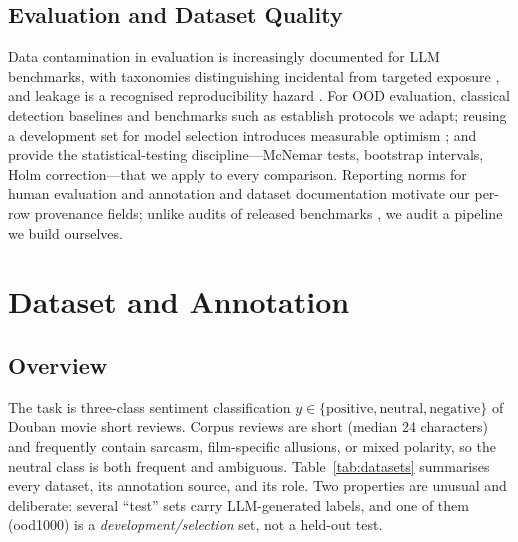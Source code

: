 \subsection{Evaluation and Dataset Quality}

Data contamination in evaluation is increasingly documented for LLM
benchmarks, with taxonomies distinguishing incidental from targeted
exposure \citep{sainz2023contamination,balloccu2024}, and leakage is
a recognised reproducibility hazard \citep{kapoor2023}. For OOD
evaluation, classical detection baselines \citep{hendrycks2017} and
benchmarks such as \citet{baran2023ood} establish protocols we
adapt; reusing a development set for model selection introduces
measurable optimism \citep{cawley2010}; and
\citet{dror2018hitchhiker} provide the statistical-testing
discipline---McNemar tests, bootstrap intervals, Holm
correction---that we apply to every comparison. Reporting norms for
human evaluation and annotation \citep{kunilovskaya2026,alkhalifa2026}
and dataset documentation \citep{bender2018,gebru2021} motivate our
per-row provenance fields; unlike audits of released benchmarks
\citep{toossi2024}, we audit a pipeline we build ourselves.

\section{Dataset and Annotation}
\label{sec:data}

\subsection{Overview}

The task is three-class sentiment classification
$y \in \{\text{positive}, \text{neutral}, \text{negative}\}$ of Douban
movie short reviews. Corpus reviews are short (median 24 characters)
and frequently contain sarcasm, film-specific allusions, or mixed
polarity, so the neutral class is both frequent and ambiguous.
Table~\ref{tab:datasets} summarises every dataset, its annotation
source, and its role. Two properties are unusual and deliberate:
several ``test'' sets carry LLM-generated labels, and one of them
(ood1000) is a \emph{development/selection} set, not a held-out test.

